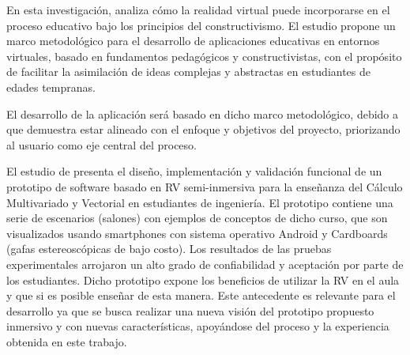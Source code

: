 En esta investigación, \citeauthor{fuenmayor} \citeyear{fuenmayor} analiza cómo la realidad virtual puede incorporarse en el proceso educativo bajo los principios del constructivismo. El estudio propone un marco metodológico para el desarrollo de aplicaciones educativas en entornos virtuales, basado en fundamentos pedagógicos y constructivistas, con el propósito de facilitar la asimilación de ideas complejas y abstractas en estudiantes de edades tempranas.

El desarrollo de la aplicación será basado en dicho marco metodológico, debido a que demuestra estar alineado con el enfoque y objetivos del proyecto, priorizando al usuario como eje central del proceso.

El estudio de \citeauthor{raigoza2017prototipo} \citeyear{raigoza2017prototipo} presenta el diseño, implementación y validación funcional de un prototipo de software basado en RV semi-inmersiva para la enseñanza del Cálculo Multivariado y Vectorial en estudiantes de ingeniería. El prototipo contiene una serie de escenarios (salones) con ejemplos de conceptos de dicho curso, que son visualizados usando smartphones con sistema operativo Android y Cardboards (gafas estereoscópicas de bajo costo). Los resultados de las pruebas experimentales arrojaron un alto grado de confiabilidad y aceptación por parte de los estudiantes. Dicho prototipo expone los beneficios de utilizar la RV en el aula y que si es posible enseñar de esta manera. Este antecedente es relevante para el desarrollo ya que se busca realizar una nueva visión del prototipo propuesto inmersivo y con nuevas características, apoyándose del proceso y la experiencia obtenida en este trabajo.

